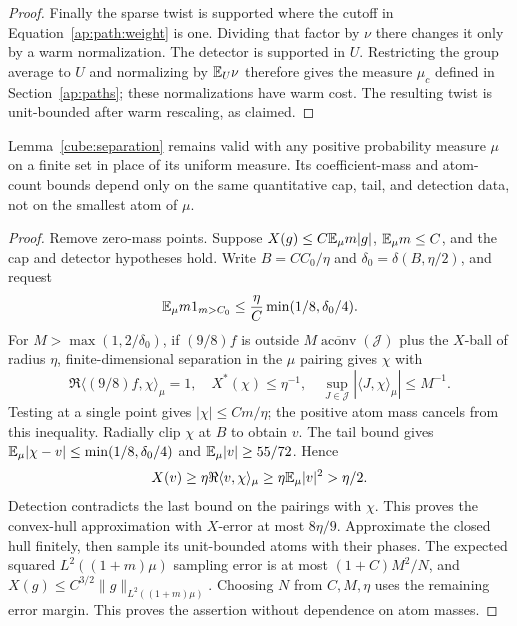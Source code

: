 \begin{proof}
Finally the sparse twist is supported where the cutoff in
Equation~\eqref{ap:path:weight} is one.  Dividing that factor
by $\nu$ there changes it only by a warm normalization.  The
detector is supported in $U$. Restricting the group average to
$U$ and normalizing by $\mathbb E_U\nu$ therefore gives the measure
$\mu_c$ defined in Section~\ref{ap:paths}; these normalizations
have warm cost. The resulting twist is unit-bounded after warm
rescaling, as claimed.
\end{proof}

\begin{lemma}
\label{ap:path:weighted-separation}
Lemma~\ref{cube:separation} remains valid with any positive
probability measure $\mu$ on a finite set in place of its
uniform measure.  Its coefficient-mass and atom-count bounds
depend only on the same quantitative cap, tail, and detection
data, not on the smallest atom of $\mu$.
\end{lemma}

\begin{proof}
Remove zero-mass points.  Suppose
$X(g)\le C\mathbb E_\mu m|g|$, $\mathbb E_\mu m\le C$, and the
cap and detector hypotheses hold.  Write
$B=CC_0/\eta$ and $\delta_0=\delta(B,\eta/2)$, and request
\[
 \mathbb E_\mu m1_{m>C_0}
 \le\frac\eta C\min(1/8,\delta_0/4).
\]
For $M>\max(1,2/\delta_0)$, if $(9/8)f$ is outside
$M\overline{\operatorname{aconv}}(\mathcal J)$ plus the
$X$-ball of radius $\eta$, finite-dimensional separation in
the $\mu$ pairing gives $\chi$ with
\[
 \Re\langle(9/8)f,\chi\rangle_\mu=1,\quad
 X^*(\chi)\le\eta^{-1},\quad
 \sup_{J\in\mathcal J}|\langle J,\chi\rangle_\mu|
 \le M^{-1}.
\]
Testing at a single point gives $|\chi|\le Cm/\eta$;
the positive atom mass cancels from this inequality.  Radially
clip $\chi$ at $B$ to obtain $v$.  The tail bound gives
$\mathbb E_\mu|\chi-v|\le\min(1/8,\delta_0/4)$ and
$\mathbb E_\mu|v|\ge55/72$.  Hence
\[
 X(v)\ge\eta\Re\langle v,\chi\rangle_\mu
 \ge\eta\mathbb E_\mu|v|^2>\eta/2.
\]
Detection contradicts the last bound on the pairings with
$\chi$.  This proves the convex-hull approximation with
$X$-error at most $8\eta/9$.  Approximate the closed hull
finitely, then sample its unit-bounded atoms with their phases.
The expected squared $L^2((1+m)\mu)$ sampling error is at
most $(1+C)M^2/N$, and
$X(g)\le C^{3/2}\|g\|_{L^2((1+m)\mu)}$.
Choosing $N$ from $C,M,\eta$ uses the remaining error margin.
This proves the assertion without dependence on atom masses.
\end{proof}

